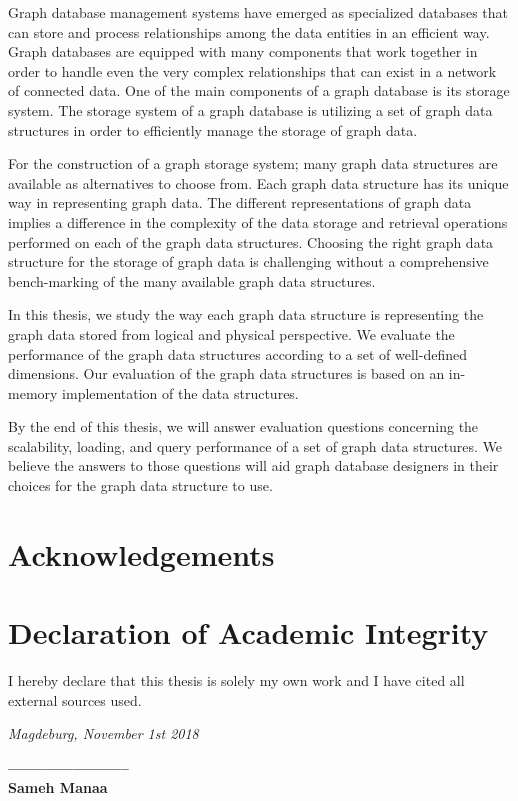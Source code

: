 
Graph database management systems have emerged as specialized databases that can store and process relationships among the data entities in an efficient way. Graph databases are equipped with many components that work together in order to handle even the very complex relationships that can exist in a network of connected data. One of the main components of a graph database is its storage system. The storage system of a graph database is utilizing a set of graph data structures in order to efficiently manage the storage of graph data. 

For the construction of a graph storage system; many graph data structures are available as alternatives to choose from. Each graph data structure has its unique way in representing graph data. The different representations of graph data implies a difference in the complexity of the data storage and retrieval operations performed on each of the graph data structures. Choosing the right graph data structure for the storage of graph data is challenging without a comprehensive bench-marking of the many available graph data structures.

In this thesis, we study the way each graph data structure is representing the graph data stored from logical and physical perspective. We evaluate the performance of the graph data structures according to a set of well-defined dimensions. Our evaluation of the graph data structures is based on an in-memory implementation of the data structures. 

By the end of this thesis, we will answer evaluation questions concerning the scalability, loading, and query performance of a set of graph data structures. We believe the answers to those questions will aid graph database designers in their choices for the graph data structure to use.

{\chapter*{Acknowledgements}}



{\chapter*{Declaration of Academic Integrity}}


I hereby declare that this thesis is solely my own work and I have cited all external sources used.

\textit{Magdeburg, November 1st 2018} 



\begin{flushright}
\textbf{———————–} \\
\textbf{Sameh Manaa}
\end{flushright}
